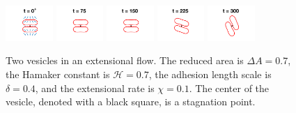 \documentclass[prf,superscriptaddress,showpacs]{revtex4-1}
\begin{document}
\begin{figure}[htp]
  \includegraphics[width = 0.16\textwidth,trim={4cm 2cm 4cm 1cm},clip]{figs/extensional_adR4em1adS7em1Chi1em1_ra070_image01.png}
  \includegraphics[width = 0.16\textwidth,trim={4cm 2cm 4cm 1cm},clip]{figs/extensional_adR4em1adS7em1Chi1em1_ra070_image02.png}
  \includegraphics[width = 0.16\textwidth,trim={4cm 2cm 4cm 1cm},clip]{figs/extensional_adR4em1adS7em1Chi1em1_ra070_image03.png}
  \includegraphics[width = 0.16\textwidth,trim={4cm 2cm 4cm 1cm},clip]{figs/extensional_adR4em1adS7em1Chi1em1_ra070_image04.png}
  \includegraphics[width = 0.16\textwidth,trim={4cm 2cm 4cm 1cm},clip]{figs/extensional_adR4em1adS7em1Chi1em1_ra070_image05.png}
  \caption{\label{fig:extensional3} Two vesicles in an extensional flow.
  The reduced area is $\Delta A = 0.7$, the Hamaker constant is $\mathcal{H} =
  0.7$, the adhesion length scale is $\delta = 0.4$, and the extensional
  rate is $\chi = 0.1$.  The center of the vesicle, denoted with a black
  square, is a stagnation point.}


\end{figure}
\end{document}
